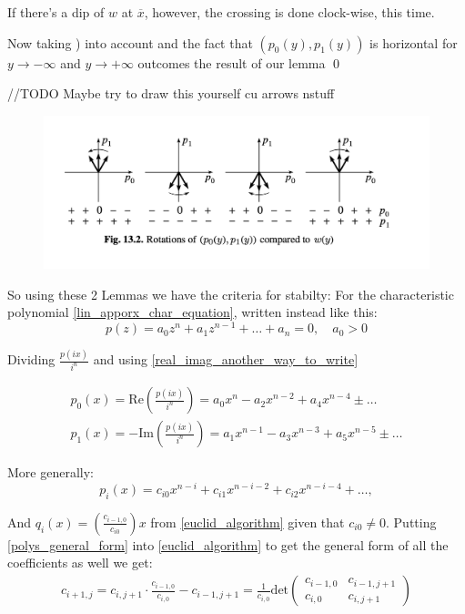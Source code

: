 If there's a dip of $w$ at $\overline{x}$, however, the crossing is done clock-wise, this time.

Now taking ) into account and the fact that $(p_0(y), p_1(y))$ is horizontal for $y \rightarrow  - \infty$ and $y \rightarrow + \infty  $ outcomes the result of our lemma
\qed

//TODO Maybe try to draw this yourself cu arrows nstuff

\begin{figure}
\includegraphics[width=13cm]{math_pics/sageti-cumse-invart.png}
\centering
\end{figure}

So using these 2 Lemmas we have the criteria for stabilty:
For the characteristic polynomial \ref{lin_apporx_char_equation}, written instead like this:
\[
p(z)=a_0 z^n + a_1z^{n-1} + \dots + a_n = 0, \quad a_0 > 0
\]

Dividing $\frac{p(i x)}{i^n}$ and using \ref{real_imag_another_way_to_write}

\begin{gather}
p_0(x)= \text{Re}(\frac{p(i x)}{i^n}) = a_0 x^{n} -a_2 x^{n-2} + a_4 x^{n-4} \pm \dots \\
p_1(x)= -\text{Im} (\frac{p(i x)}{i^n}) = a_1 x^{n-1} -a_3 x^{n-3} + a_5 x^{n-5} \pm \dots
\end{gather}

More generally:
\begin{equation}\label{polys_general_form}
p_i(x) = c_{i0} x^{n-i} + c_{i1} x^{n-i-2} + c_{ i2 } x^{ n-i-4  } + \dots, \tag{Gen. Form}
\end{equation}

And $q_i(x) = (  \frac{c_{ i-1 ,0}}{c_{ i0 }} )x$ from \ref{euclid_algorithm} given that $c_{i0} \neq 0$.
Putting \ref{polys_general_form} into \ref{euclid_algorithm} to get the general form of all the coefficients as well we get:
\begin{align}\label{coeff_gen_form}
c_{i+1,j} = c_{i,j+1} \cdot \frac{c_{i-1,0}}{c_{i,0}} - c_{i-1,j+1 } = \frac{1}{c_{i,0}} \text{det}
\begin{pmatrix}
c_{i-1,0} & c_{i-1, j+1} \\
c_{i,0} & c_{i, j+1} \tag{Coeff.}
\end{pmatrix}
\end{align}

